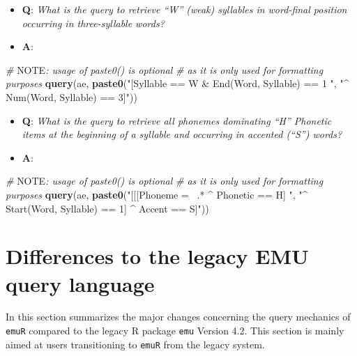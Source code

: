 \documentclass[]{book}
\newenvironment{Shaded}{\begin{snugshade}}{\end{snugshade}}
\newcommand{\AlertTok}[1]{\textcolor[rgb]{0.94,0.16,0.16}{#1}}
\newcommand{\CommentTok}[1]{\textcolor[rgb]{0.56,0.35,0.01}{\textit{#1}}}
\newcommand{\KeywordTok}[1]{\textcolor[rgb]{0.13,0.29,0.53}{\textbf{#1}}}
\newcommand{\NormalTok}[1]{#1}
\newcommand{\StringTok}[1]{\textcolor[rgb]{0.31,0.60,0.02}{#1}}
\providecommand{\tightlist}{%
  \setlength{\itemsep}{0pt}\setlength{\parskip}{0pt}}
\begin{document}
\begin{itemize}
\tightlist
\item
  \textbf{Q}: \emph{What is the query to retrieve ``W'' (weak) syllables in word-final position occurring in three-syllable words?}
\item
  \textbf{A}:
\end{itemize}

\begin{Shaded}
\begin{Highlighting}[]
\CommentTok{# }\AlertTok{NOTE}\CommentTok{: usage of paste0() is optional}
\CommentTok{# as it is only used for formatting purposes}
\KeywordTok{query}\NormalTok{(ae, }\KeywordTok{paste0}\NormalTok{(}\StringTok{"[Syllable == W & End(Word, Syllable) == 1 "}\NormalTok{,}
                 \StringTok{"^ Num(Word, Syllable) == 3]"}\NormalTok{))}
\end{Highlighting}
\end{Shaded}

\begin{itemize}
\tightlist
\item
  \textbf{Q}: \emph{What is the query to retrieve all phonemes dominating ``H'' Phonetic items at the beginning of a syllable and occurring in accented (``S'') words?}
\item
  \textbf{A}:
\end{itemize}

\begin{Shaded}
\begin{Highlighting}[]
\CommentTok{# }\AlertTok{NOTE}\CommentTok{: usage of paste0() is optional}
\CommentTok{# as it is only used for formatting purposes}
\KeywordTok{query}\NormalTok{(ae, }\KeywordTok{paste0}\NormalTok{(}\StringTok{"[[[Phoneme =~ .* ^ Phonetic == H] "}\NormalTok{,}
                 \StringTok{"^ Start(Word, Syllable) == 1] ^ Accent == S]"}\NormalTok{))}
\end{Highlighting}
\end{Shaded}

\hypertarget{differences-to-the-legacy-emu-query-language}{%
\section{Differences to the legacy EMU query language}\label{differences-to-the-legacy-emu-query-language}}

In this section summarizes the major changes concerning the query mechanics of \texttt{emuR} compared to the legacy R package \texttt{emu} Version 4.2. This section is mainly aimed at users transitioning to \texttt{emuR} from the legacy system.
\end{document}
